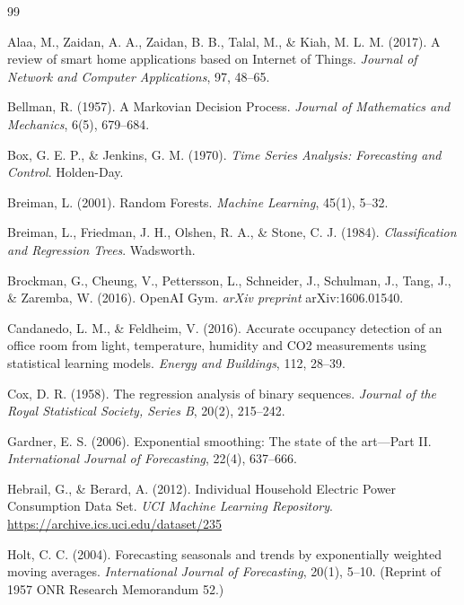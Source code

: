 \documentclass[11pt,a4paper]{article}
\begin{document}
\begingroup
\small
\begin{thebibliography}{99}
\setlength{\itemsep}{0.3em}

 Alaa, M., Zaidan, A. A., Zaidan, B. B., Talal, M., \& Kiah, M. L. M. (2017). A review of smart home applications based on Internet of Things. \emph{Journal of Network and Computer Applications}, 97, 48--65.

 Bellman, R. (1957). A Markovian Decision Process. \emph{Journal of Mathematics and Mechanics}, 6(5), 679--684.

 Box, G. E. P., \& Jenkins, G. M. (1970). \emph{Time Series Analysis: Forecasting and Control}. Holden-Day.

 Breiman, L. (2001). Random Forests. \emph{Machine Learning}, 45(1), 5--32.

 Breiman, L., Friedman, J. H., Olshen, R. A., \& Stone, C. J. (1984). \emph{Classification and Regression Trees}. Wadsworth.

 Brockman, G., Cheung, V., Pettersson, L., Schneider, J., Schulman, J., Tang, J., \& Zaremba, W. (2016). OpenAI Gym. \emph{arXiv preprint} arXiv:1606.01540.

 Candanedo, L. M., \& Feldheim, V. (2016). Accurate occupancy detection of an office room from light, temperature, humidity and CO2 measurements using statistical learning models. \emph{Energy and Buildings}, 112, 28--39.

 Cox, D. R. (1958). The regression analysis of binary sequences. \emph{Journal of the Royal Statistical Society, Series B}, 20(2), 215--242.

 Gardner, E. S. (2006). Exponential smoothing: The state of the art---Part II. \emph{International Journal of Forecasting}, 22(4), 637--666.

 Hebrail, G., \& Berard, A. (2012). Individual Household Electric Power Consumption Data Set. \emph{UCI Machine Learning Repository}. \url{https://archive.ics.uci.edu/dataset/235}

 Holt, C. C. (2004). Forecasting seasonals and trends by exponentially weighted moving averages. \emph{International Journal of Forecasting}, 20(1), 5--10. (Reprint of 1957 ONR Research Memorandum 52.)


\end{thebibliography}
\end{document}
